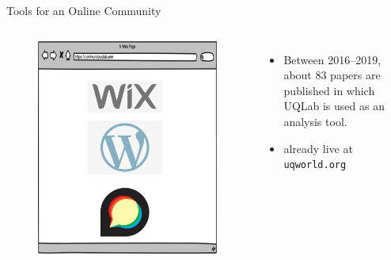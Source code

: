 \documentclass[]{rsuqbeamernew}
\begin{document}
\begin{frame}[t]{Tools for an Online Community}

  \begin{columns}
    \begin{minipage}[c][0.80\textheight][c]{\linewidth}
      \begin{figure}
        \centering
        \includegraphics[width=1.0\linewidth]{../figures/communityPlatform}
      \end{figure}
    \end{minipage}
      
  \begin{itemize}
    \item Between 2016--2019, about 83 papers are published in which UQLab is used as an analysis tool.
    \item already live at \texttt{uqworld.org}
  \end{itemize}
  \hfill
 \end{columns}

\end{frame}
  
\end{document}
